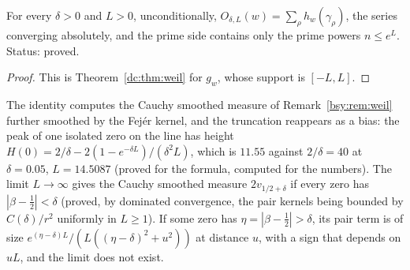 \begin{theorem}\label{cm:thm:flow}
For every $\delta>0$ and $L>0$, unconditionally, $O_{\delta,L}(w)=\sum_\rho h_w(\gamma_\rho)$, the series converging absolutely, and the prime side contains only the prime powers $n\le e^L$. Status: proved.
\end{theorem}

\begin{proof}
This is Theorem~\ref{dc:thm:weil} for $g_w$, whose support is $[-L,L]$.
\end{proof}

The identity computes the Cauchy smoothed measure of Remark~\ref{bsy:rem:weil} further smoothed by the Fej\'er kernel, and the truncation reappears as a bias: the peak of one isolated zero on the line has height $H(0)=2/\delta-2(1-e^{-\delta L})/(\delta^2L)$, which is $11.55$ against $2/\delta=40$ at $\delta=0.05$, $L=14.5087$ (proved for the formula, computed for the numbers). The limit $L\to\infty$ gives the Cauchy smoothed measure $2v_{1/2+\delta}$ if every zero has $|\beta-\frac12|<\delta$ (proved, by dominated convergence, the pair kernels being bounded by $C(\delta)/r^2$ uniformly in $L\ge1$). If some zero has $\eta=|\beta-\frac12|>\delta$, its pair term is of size $e^{(\eta-\delta)L}/(L((\eta-\delta)^2+u^2))$ at distance $u$, with a sign that depends on $uL$, and the limit does not exist.

